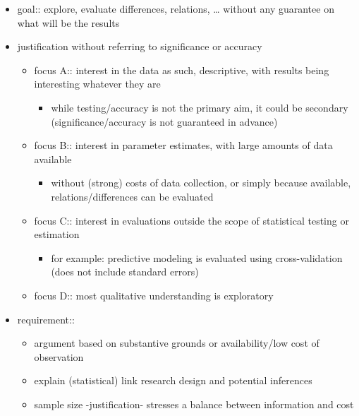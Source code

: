 \documentclass[]{article}
\providecommand{\tightlist}{%
  \setlength{\itemsep}{0pt}\setlength{\parskip}{0pt}}
\begin{document}
\begin{itemize}
\tightlist
\item
  goal:: explore, evaluate differences, relations, \ldots{} without any
  guarantee on what will be the results
\item
  justification without referring to significance or accuracy

  \begin{itemize}
  \tightlist
  \item
    focus A:: interest in the data as such, descriptive, with results
    being interesting whatever they are

    \begin{itemize}
    \tightlist
    \item
      while testing/accuracy is not the primary aim, it could be
      secondary (significance/accuracy is not guaranteed in advance)
    \end{itemize}
  \item
    focus B:: interest in parameter estimates, with large amounts of
    data available

    \begin{itemize}
    \tightlist
    \item
      without (strong) costs of data collection, or simply because
      available, relations/differences can be evaluated
    \end{itemize}
  \item
    focus C:: interest in evaluations outside the scope of statistical
    testing or estimation

    \begin{itemize}
    \tightlist
    \item
      for example: predictive modeling is evaluated using
      cross-validation (does not include standard errors)
    \end{itemize}
  \item
    focus D:: most qualitative understanding is exploratory
  \end{itemize}
\item
  requirement::

  \begin{itemize}
  \tightlist
  \item
    argument based on substantive grounds or availability/low cost of
    observation
  \item
    explain (statistical) link research design and potential inferences
  \item
    sample size -justification- stresses a balance between information
    and cost
  \end{itemize}
\end{itemize}
\end{document}
